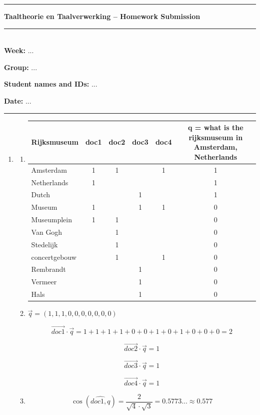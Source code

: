 \documentclass[11pt]{article}
\begin{document}
\rule{\textwidth}{1pt}
\begin{center}
\textbf{Taaltheorie en Taalverwerking -- Homework Submission}
\end{center}
\rule{\textwidth}{0.5pt}\\

\textbf{Week:} ...

\textbf{Group:} ...

\textbf{Student names and IDs:} ...

\textbf{Date:} ...

\rule{\textwidth}{1pt}

\begin{enumerate}

\item
\begin{enumerate}
\item

\begin{tabular}{l|c|c|c|c|c}
Rijksmuseum & doc1 & doc2 & doc3 & doc4 & q = what is the rijksmuseum in Amsterdam, Netherlands \\
\hline
Amsterdam & 1 & 1 &  & 1 & 1\\
Netherlands & 1 &  &  &  & 1\\
Dutch &  &  & 1 &  & 1\\
Museum & 1 &  & 1 & 1 & 0\\
Museumplein & 1 & 1 &  &  & 0\\
Van Gogh &  & 1 &  &  & 0\\
Stedelijk &  & 1 &  &  & 0\\
concertgebouw &  & 1 &  & 1 & 0\\
Rembrandt &  &  & 1 &  & 0\\
Vermeer &  &  & 1 &  & 0\\
Hals &  &  & 1 &  & 0
\end{tabular}

\item

$\vec{q}=(1,1,1,0,0,0,0,0,0,0)$

\[
\vec{doc1}\cdot\vec{q}=1+1+1+1+0+0+1+0+1+0+0+0=2
\]

\[
\vec{doc2}\cdot\vec{q}=1
\]

\[
\vec{doc3}\cdot\vec{q}=1
\]

\[
\vec{doc4}\cdot\vec{q}=1
\]

\item

\[
\cos(\widehat{doc1,q})=\frac{2}{\sqrt{4}\cdot\sqrt{3}}=0.5773...\approx0.577
\]


\end{enumerate}
\end{enumerate}
\end{document}
